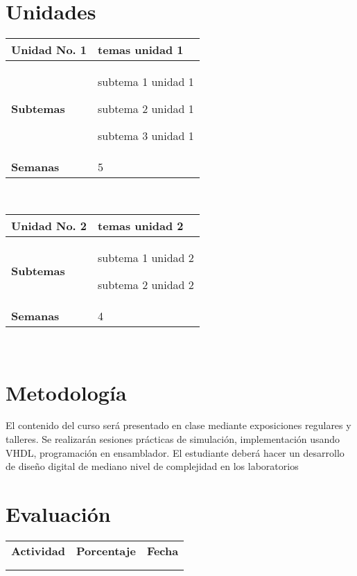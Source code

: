 \documentclass[11pt]{article}
\begin{document}
\section*{Unidades}
\noindent 
\begin{tabular}{R{0.16\textwidth} L{0.7\textwidth}} 
 \\ 
\toprule \textbf{Unidad No. 1} & temas unidad 1 
 \\ 
\midrule\textbf{Subtemas} & 
\begin{description}
 \item subtema 1 unidad 1 \item subtema 2 unidad 1 \item subtema 3 unidad 1 
\end{description}
 \\ 
\textbf{Semanas} & 5 
\end{tabular} 
 \\ 
 \begin{tabular}{R{0.16\textwidth} L{0.7\textwidth}} 
 \\ 
\toprule \textbf{Unidad No. 2} & temas unidad 2 
 \\ 
\midrule\textbf{Subtemas} & 
\begin{description}
 \item subtema 1 unidad 2 \item subtema 2 unidad 2 
\end{description}
 \\ 
\textbf{Semanas} & 4 
\end{tabular} 
 \\ 
 

\section*{Metodología}

El contenido del curso será presentado en clase mediante exposiciones regulares y talleres. Se realizarán sesiones prácticas de simulación, implementación usando VHDL, programación en ensamblador. El estudiante deberá hacer un desarrollo de diseño digital de mediano nivel de complejidad en los laboratorios

\section*{Evaluación}
\noindent \begin{tabular}{R{0.5\textwidth} C{0.2\textwidth} C{0.2\textwidth}}
	\toprule
	\textbf{Actividad} & \textbf{Porcentaje} & \textbf{Fecha} \\
	\\
	\midrule
	
	\\
	\midrule
\end{tabular}
\\
\end{document}
